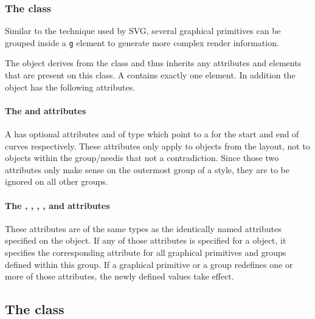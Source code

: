 \subsubsection{The  class}
\label{rendergroup-class}

Similar to the technique used by SVG, several graphical primitives can be grouped inside a \texttt{g} 
element to generate more complex render information.



The \RenderGroup object derives from the \GraphicalPrimitiveTwoD class
and thus inherits any attributes and elements that are present on this
class.
A \RenderGroup contains exactly one \ListOfElements element.
In addition the \RenderGroup object has the following attributes.

\paragraph{The \fixttspace{} and \fixttspace{} attributes}

A \RenderGroup has optional attributes  and  of type
 which point to a \LineEnding for the start and end of curves respectively. These attributes only apply to \RenderCurve objects from the layout, not
to \RenderCurve objects within the group/need{is that not a contradiction}. Since those two attributes only make sense on the outermost group of a style,
they are to be ignored on all other groups. 

\paragraph{The \fixttspace{}, \fixttspace{}, \fixttspace{} , \fixttspace{},  \fixttspace{} and\fixttspace{} attributes}

These attributes are of the same types as the identically named attributes specified on the \Text object.   If any of those attributes is specified for a \RenderGroup object, it 
specifies the corresponding attribute for all graphical primitives and groups 
defined within this group. If a graphical primitive or a group redefines one or 
more of those attributes, the newly defined values take effect.

\subsection{The  class}
\label{lineending-class}

